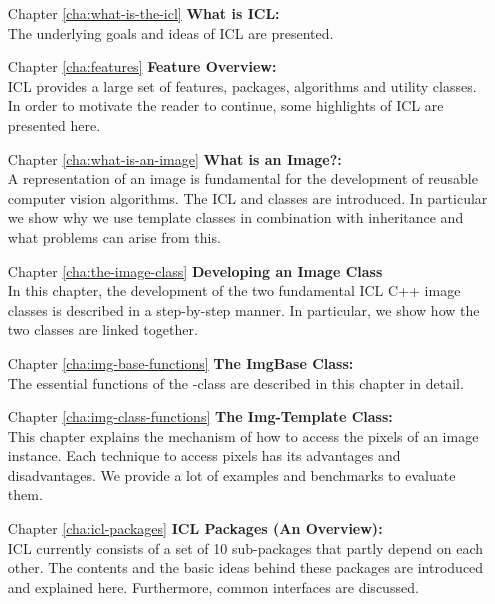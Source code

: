 \begin{itemize}
\item [Chapter \ref{cha:what-is-the-icl}] \textbf{What is ICL:}\\ The underlying goals and ideas of ICL are presented. 
\item [Chapter \ref{cha:features}] \textbf{Feature Overview:}\\ ICL provides a large set of features, packages, algorithms and utility classes. In order to motivate the reader to continue, some highlights of ICL are presented here.
\item [Chapter \ref{cha:what-is-an-image}] \textbf{What is an Image?:}\\ A representation of an image is fundamental for the development of reusable computer vision algorithms. The ICL   and   classes are introduced. In particular we show why we use template classes in combination with inheritance and what problems can arise from this.
\item [Chapter \ref{cha:the-image-class}]\textbf{Developing an Image Class}\\
In this chapter, the development of the two fundamental ICL C++ image classes is described in a step-by-step manner. In particular, we show how the two classes are linked together.
\item [Chapter \ref{cha:img-base-functions}]\textbf{The ImgBase Class:}\\
The essential functions of the -class are described in this chapter in detail.
\item [Chapter \ref{cha:img-class-functions}]\textbf{The Img-Template Class:}\\
This chapter explains the mechanism of how to access the pixels of an image instance. Each technique to access pixels has its advantages and disadvantages. We provide a lot of examples and benchmarks to evaluate them.
\item [Chapter \ref{cha:icl-packages}]\textbf{ICL Packages (An Overview):}\\ ICL currently consists of a set of 10 sub-packages that partly depend on each other. The contents and the basic ideas behind these packages are introduced and explained here. Furthermore, common interfaces are discussed.

\end{itemize}
